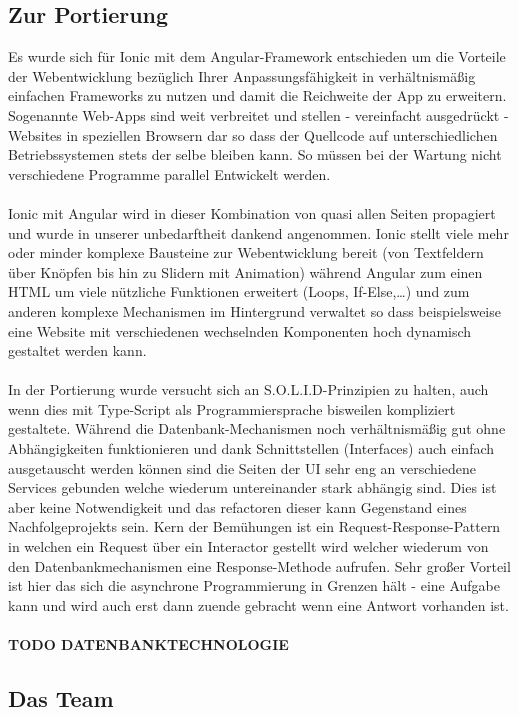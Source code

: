 \subsection{Zur Portierung}
Es wurde sich für Ionic mit dem Angular-Framework entschieden um die Vorteile der Webentwicklung bezüglich Ihrer Anpassungsfähigkeit in verhältnismäßig einfachen Frameworks zu nutzen und damit die Reichweite der App zu erweitern. Sogenannte \glqq Web-Apps\grqq{} sind weit verbreitet und stellen - vereinfacht ausgedrückt - Websites in speziellen Browsern dar so dass der Quellcode auf unterschiedlichen Betriebssystemen stets der selbe bleiben kann. So müssen bei der Wartung nicht verschiedene Programme parallel Entwickelt werden.\\\\
Ionic mit Angular wird in dieser Kombination von quasi allen Seiten propagiert und wurde in unserer unbedarftheit dankend angenommen. Ionic stellt viele mehr oder minder komplexe Bausteine zur Webentwicklung bereit (von Textfeldern über Knöpfen bis hin zu Slidern mit Animation) während Angular zum einen HTML um viele nützliche \glqq Funktionen\grqq{} erweitert (Loops, If-Else,\dots) und zum anderen komplexe Mechanismen im Hintergrund verwaltet so dass beispielsweise eine Website mit verschiedenen wechselnden Komponenten hoch dynamisch gestaltet werden kann.\\\\
In der Portierung wurde versucht sich an S.O.L.I.D-Prinzipien zu halten, auch wenn dies mit Type-Script als Programmiersprache bisweilen kompliziert gestaltete. Während die Datenbank-Mechanismen noch verhältnismäßig gut ohne Abhängigkeiten funktionieren und dank Schnittstellen (Interfaces) auch einfach ausgetauscht werden können sind die Seiten der UI sehr eng an verschiedene \glqq Services\grqq{} gebunden welche wiederum untereinander stark abhängig sind. Dies ist aber keine Notwendigkeit und das refactoren dieser kann Gegenstand eines Nachfolgeprojekts sein. Kern der Bemühungen ist ein \glqq Request-Response\grqq -Pattern in welchen ein Request über ein Interactor gestellt wird welcher wiederum von den Datenbankmechanismen eine Response-Methode aufrufen. Sehr großer Vorteil ist hier das sich die asynchrone Programmierung in Grenzen hält - eine Aufgabe kann und wird auch erst dann zuende gebracht wenn eine Antwort vorhanden ist.\\\\
\textbf{TODO DATENBANKTECHNOLOGIE}
\subsection{Das Team}
